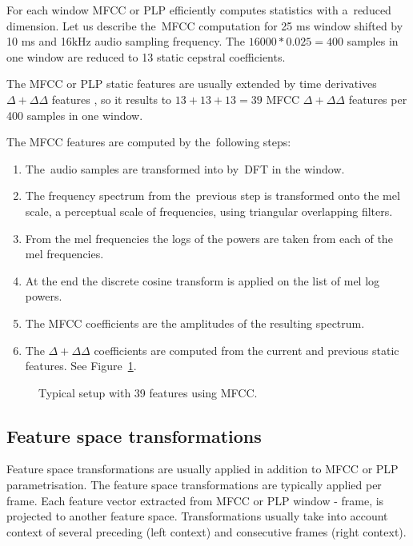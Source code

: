 For each window \ac{MFCC} or \ac{PLP} efficiently computes statistics with a~reduced dimension. 
Let us describe the~\ac{MFCC} computation for 25 ms window shifted by 10 ms and 16kHz audio sampling frequency. 
The $16000 * 0.025 = 400$ samples in one window are reduced to 13 static cepstral coefficients.

The \ac{MFCC} or \ac{PLP} static features are usually extended 
by time derivatives $\Delta+\Delta\Delta$ features \cite{psutka2001comparison},
so it results to $13 + 13 + 13 = 39$ \ac{MFCC} $\Delta+\Delta\Delta$ features 
per 400 samples in one window.

The \ac{MFCC} features are computed by the~following steps:

\small{\begin{enumerate}
    \item The~audio samples are transformed into  by~\ac{DFT} in the window.
    \item The frequency spectrum from the~previous step is transformed onto the mel scale, a perceptual scale of frequencies, using triangular overlapping filters.
    \item From the mel frequencies the logs of the powers are taken from each of the mel frequencies.
    \item At the end the discrete cosine transform is applied on the list of mel log powers.
    \item The \ac{MFCC} coefficients are the amplitudes of the resulting spectrum.
    \item The $\Delta+\Delta\Delta$ coefficients are computed from the current and previous static features. See Figure~\ref{fig:delta}.
\end{enumerate}

\begin{figure}
    \begin{center}
    
    \caption{Typical setup with 39 features using \ac{MFCC}.}
    \label{fig:delta} 
    \end{center}
\end{figure}

\subsection*{Feature space transformations}
Feature space transformations are usually applied in addition to \ac{MFCC} or \ac{PLP} parametrisation.
The feature space transformations are typically applied per frame. 
Each feature vector extracted from \ac{MFCC} or \ac{PLP} window - frame, is projected to another feature space.
Transformations usually take into account context of several preceding (left context) and consecutive frames (right context).

}
